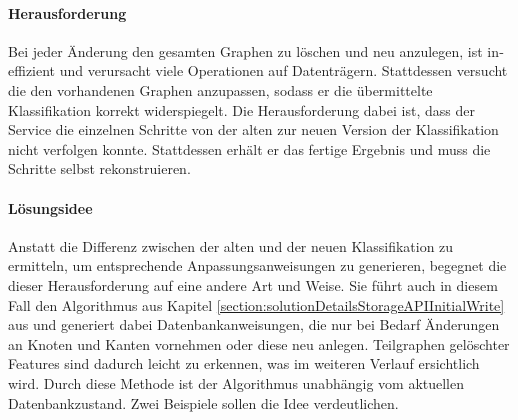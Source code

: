     \paragraph{Herausforderung}
    Bei jeder Änderung den gesamten Graphen zu löschen und neu anzulegen,
    ist in­ef­fi­zi­ent und verursacht viele Operationen auf Datenträgern.
    Stattdessen versucht die {\classificationStorageAPI} den vorhandenen Graphen anzupassen,
    sodass er die übermittelte Klassifikation korrekt widerspiegelt.
    Die Herausforderung dabei ist, dass der Service
    die einzelnen Schritte von der alten zur neuen Version der Klassifikation nicht verfolgen konnte.
    Stattdessen erhält er das fertige Ergebnis und muss die Schritte selbst rekonstruieren.

    \paragraph{Lösungsidee}
    Anstatt die Differenz zwischen der alten und der neuen Klassifikation zu ermitteln,
    um entsprechende Anpassungsanweisungen zu generieren,
    begegnet die {\classificationStorageAPI} dieser Herausforderung auf eine andere Art und Weise.
    Sie führt auch in diesem Fall den Algorithmus aus Kapitel \ref{section:solutionDetailsStorageAPIInitialWrite}
    aus und generiert dabei Datenbankanweisungen,
    die nur bei Bedarf Änderungen an Knoten und Kanten vornehmen oder diese neu anlegen.
    Teilgraphen gelöschter Features sind dadurch leicht zu erkennen,
    was im weiteren Verlauf ersichtlich wird.
    Durch diese Methode ist der Algorithmus unabhängig vom aktuellen Datenbankzustand.
    Zwei Beispiele sollen die Idee verdeutlichen.

